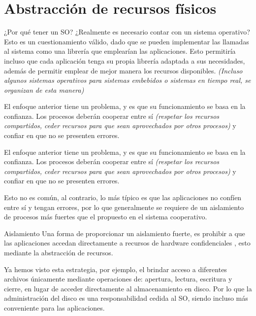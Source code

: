 \documentclass{libs/ufc_format}
\begin{document}
\section{Abstracción de recursos físicos}
\begin{frame}{¿Por qué tener un SO?}
  ¿Realmente es necesario contar con un sistema operativo? Esto es un cuestionamiento válido, dado que se pueden implementar las llamadas al sistema como una librería que emplearían las aplicaciones. Esto permitiría incluso que cada aplicación tenga su propia librería adaptada a sus necesidades, además de permitir emplear de mejor manera los recursos disponibles. \emph{(Incluso algunos sistemas operativos para sistemas embebidos o sistemas en tiempo real, se organizan de esta manera)}

  \vspace{0.3cm}

  El enfoque anterior tiene un problema, y es que su funcionamiento se basa en la confianza. Los procesos deberán cooperar entre sí \emph{(respetar los recursos compartidos, ceder recursos para que sean aprovechados por otros procesos)} y confiar en que no se presenten errores.
\end{frame}
\begin{frame}
  El enfoque anterior tiene un problema, y es que su funcionamiento se basa en la confianza. Los procesos deberán cooperar entre sí \emph{(respetar los recursos compartidos, ceder recursos para que sean aprovechados por otros procesos)} y confiar en que no se presenten errores.

  \vspace{0.3cm}

  Esto no es común, al contrario, lo más típico es que las aplicaciones no confíen entre sí y tengan errores, por lo que generalmente se requiere de un aislamiento de procesos más fuertes que el propuesto en el sistema cooperativo.
\end{frame}
\begin{frame}{Aislamiento}
  Una forma de proporcionar un aislamiento fuerte, es prohibir a que las aplicaciones accedan directamente a recursos de hardware confidenciales \cite{xv6_book}, esto mediante la abstracción de recursos.

  \vspace{0.2cm}

  Ya hemos visto esta estrategia, por ejemplo, el brindar acceso a diferentes archivos únicamente mediante operaciones de: apertura, lectura, escritura y cierre, en lugar de acceder directamente al almacenamiento en disco. Por lo que la administración del disco es una responsabilidad cedida al SO, siendo incluso más conveniente para las aplicaciones.
\end{frame}
\end{document}
